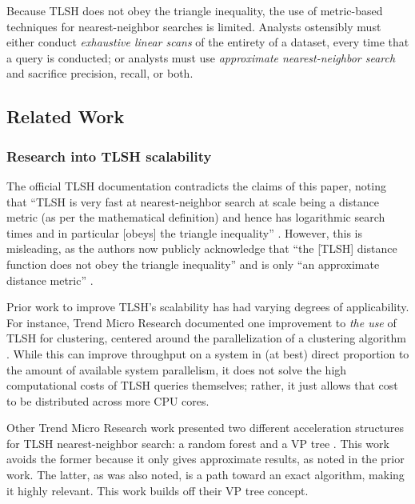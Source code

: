 \documentclass[5p,final]{elsarticle}
\begin{document}
Because TLSH does not obey the triangle inequality, the use of metric-based
techniques for nearest-neighbor searches is limited. Analysts ostensibly
must either conduct \textit{exhaustive linear scans} of the entirety of
a dataset, every time that a query is conducted; or analysts must use
\textit{approximate nearest-neighbor search} and sacrifice precision,
recall, or both.

\subsection{Related Work}

\subsubsection{Research into TLSH scalability}\label{scalability}

The official TLSH documentation contradicts the claims of this paper,
noting that \enquote{TLSH is very fast at nearest-neighbor search
	at scale \textelp{} being a distance metric (as per the
	mathematical definition) and hence has logarithmic search times
\textelp{} and in particular [obeys] the triangle inequality}
\cite{oliverTLSHTechnicalOverview2021}. However, this is misleading,
as the authors now publicly acknowledge that
\enquote{the [TLSH] distance function does not obey the triangle inequality}
\cite{oliverTLSHDistanceMetric2024} and is only
\enquote{an approximate distance metric} \cite{oliverHACTFastSearch2020}.

Prior work to improve TLSH's scalability has had varying degrees of
applicability. For instance, Trend Micro Research documented one
improvement to \textit{the use} of TLSH for clustering, centered
around the parallelization of a clustering algorithm
\cite{aliScalableMalwareClustering2020}. While this can improve
throughput on a system in (at best) direct proportion to the amount
of available system parallelism, it does not solve the high
computational costs of TLSH queries themselves; rather, it just
allows that cost to be distributed across more CPU cores.

Other Trend Micro Research work presented two different acceleration
structures for TLSH nearest-neighbor search: a random forest and a VP
tree \cite{oliverFastClusteringHigh2021}. This work avoids the
former because it only gives approximate results, as noted in the prior work.
The latter, as was also noted, is a path toward an exact algorithm, making it
highly relevant. This work builds off their VP tree concept.
\end{document}
